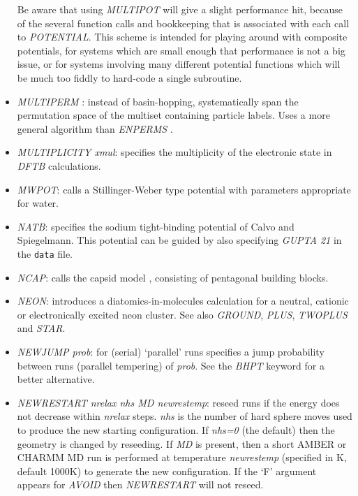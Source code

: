 \documentclass[12pt,a4paper,dvips]{article}
\begin{document}
\begin{itemize}
Be aware that using {\it MULTIPOT} will give a slight performance hit, because of the several function calls and bookkeeping that
is associated with each call to {\it POTENTIAL}. This scheme is intended for playing around with composite potentials, for systems which are small enough that performance is not a big issue, or for systems involving many different potential functions which will be much too fiddly to hard-code a single subroutine.

\item {\it MULTIPERM \/}: instead of basin-hopping, systematically span the permutation space of the multiset containing particle labels. Uses a more general algorithm than {\it ENPERMS \/}.

\item {\it MULTIPLICITY xmul\/}: specifies the multiplicity of the electronic state in {\it DFTB\/}
calculations.

\item {\it MWPOT}: calls a Stillinger-Weber type potential with parameters appropriate for water\cite{MolineroM09}.

\item {\it NATB}: specifies the sodium tight-binding potential of Calvo and Spiegelmann.
This potential can be guided by also specifying {\it GUPTA 21} in the {\tt data} file.

\item {\it NCAP\/}: calls the capsid model \cite{Wales05}, consisting of pentagonal building blocks.

\item {\it NEON\/}: introduces a diatomics-in-molecules calculation for
a neutral, cationic or electronically excited neon cluster. See also
{\it GROUND\/}, {\it PLUS\/}, {\it TWOPLUS\/} and {\it STAR\/}.

\item {\it NEWJUMP prob\/}: for (serial)
`parallel' runs specifies a jump probability between runs 
(parallel tempering) of {\it prob\/}.
See the {\it BHPT\/} keyword for a better alternative.

\item {\it NEWRESTART nrelax nhs MD newrestemp\/}: reseed runs if the energy does not decrease within {\it nrelax} steps.
{\it nhs} is the number of hard sphere moves used to produce the new starting configuration.
If {\it nhs=0} (the default) then the geometry is changed by reseeding. If {\it MD} is present, then a short AMBER or CHARMM MD run is performed at temperature {\it newrestemp} (specified in K, default 1000K) to generate the new configuration.
If the `F' argument appears for {\it AVOID\/} then
{\it NEWRESTART\/} will not reseed.


\end{itemize}
\end{document}
